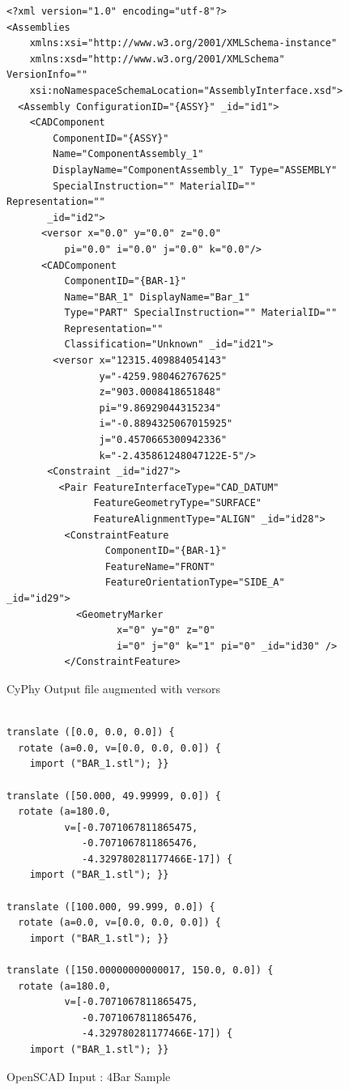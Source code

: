 \documentclass[]{report}
\begin{document}
\begin{figure}
	\begin{lstlisting}
<?xml version="1.0" encoding="utf-8"?>
<Assemblies  
    xmlns:xsi="http://www.w3.org/2001/XMLSchema-instance" 
    xmlns:xsd="http://www.w3.org/2001/XMLSchema" VersionInfo=""     
    xsi:noNamespaceSchemaLocation="AssemblyInterface.xsd">
  <Assembly ConfigurationID="{ASSY}" _id="id1">
    <CADComponent  
        ComponentID="{ASSY}" 
        Name="ComponentAssembly_1"
        DisplayName="ComponentAssembly_1" Type="ASSEMBLY"
        SpecialInstruction="" MaterialID="" Representation=""
       _id="id2">
      <versor x="0.0" y="0.0" z="0.0" 
          pi="0.0" i="0.0" j="0.0" k="0.0"/>
      <CADComponent 
          ComponentID="{BAR-1}" 
          Name="BAR_1" DisplayName="Bar_1"
          Type="PART" SpecialInstruction="" MaterialID=""
          Representation=""
          Classification="Unknown" _id="id21">
        <versor x="12315.409884054143" 
                y="-4259.980462767625"
                z="903.0008418651848" 
                pi="9.86929044315234" 
                i="-0.8894325067015925" 
                j="0.4570665300942336"  
                k="-2.435861248047122E-5"/>
       <Constraint _id="id27">
         <Pair FeatureInterfaceType="CAD_DATUM"
               FeatureGeometryType="SURFACE"           
               FeatureAlignmentType="ALIGN" _id="id28">
          <ConstraintFeature 
                 ComponentID="{BAR-1}" 
                 FeatureName="FRONT"
                 FeatureOrientationType="SIDE_A" _id="id29">
            <GeometryMarker 
                   x="0" y="0" z="0" 
                   i="0" j="0" k="1" pi="0" _id="id30" />
          </ConstraintFeature> 
\end{lstlisting}
\caption{CyPhy Output file augmented with versors}
\end{figure}

\begin{figure}
	\begin{lstlisting}
	
translate ([0.0, 0.0, 0.0]) {
  rotate (a=0.0, v=[0.0, 0.0, 0.0]) {
    import ("BAR_1.stl"); }}

translate ([50.000, 49.99999, 0.0]) {
  rotate (a=180.0, 
          v=[-0.7071067811865475, 
             -0.7071067811865476, 
             -4.329780281177466E-17]) {
    import ("BAR_1.stl"); }}

translate ([100.000, 99.999, 0.0]) {
  rotate (a=0.0, v=[0.0, 0.0, 0.0]) {
    import ("BAR_1.stl"); }}

translate ([150.00000000000017, 150.0, 0.0]) {
  rotate (a=180.0, 
          v=[-0.7071067811865475, 
             -0.7071067811865476,
             -4.329780281177466E-17]) {
    import ("BAR_1.stl"); }}
\end{lstlisting}
\caption{OpenSCAD Input : 4Bar Sample}
\end{figure}
\end{document}
